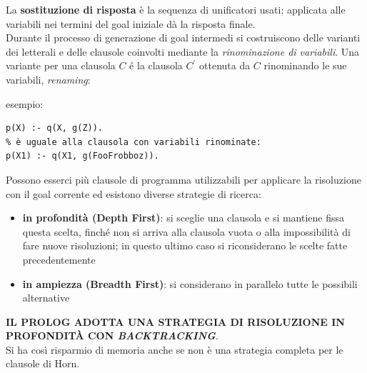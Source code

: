 \documentclass[a4paper,12pt, oneside]{book}
\begin{document}
La \textbf{sostituzione di risposta} è la sequenza di unificatori usati; applicata alle variabili nei termini del goal iniziale dà la risposta finale.\\
Durante il processo di generazione di goal intermedi si costruiscono delle varianti dei letterali e delle clausole coinvolti mediante la\textit{ rinominazione di variabili}. Una variante per una clausola $C$ é la clausola $C^{'}$ ottenuta da $C$ rinominando le sue variabili, \textit{renaming}:
\begin{esempio}
	esempio:
	\begin{verbatim}
p(X) :- q(X, g(Z)).
% è uguale alla clausola con variabili rinominate:
p(X1) :- q(X1, g(FooFrobboz)).
\end{verbatim}
\end{esempio}
Possono esserci più clausole di programma utilizzabili per applicare la risoluzione con il goal corrente ed esistono diverse strategie di ricerca:
\begin{itemize}
	\item \textbf{in profondità (Depth First)}: si sceglie una clausola e si mantiene fissa questa scelta, finché non si arriva alla clausola vuota o alla impossibilità di fare nuove risoluzioni; in questo ultimo caso si riconsiderano le scelte fatte precedentemente
	\item \textbf{in ampiezza (Breadth First)}: si considerano in parallelo tutte le possibili alternative
\end{itemize}
\textbf{IL PROLOG ADOTTA UNA STRATEGIA DI RISOLUZIONE IN PROFONDITÀ CON \textit{BACKTRACKING}}.\\
Si ha così risparmio di memoria anche se non è una strategia completa per le clausole di Horn.\\
\end{document}
